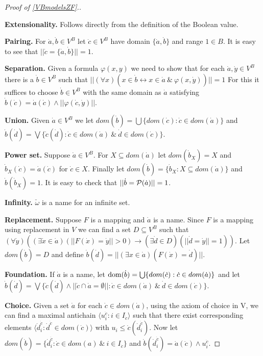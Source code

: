\begin{proof}[Proof of \ref{VBmodelsZF}.]\label{VBmodelsZFproof}

 {\bf Extensionality.} Follows directly from the definition of the Boolean value.

 {\bf Pairing.} For $\dot{a},\dot{b}\in V^B$ let $\dot{c}\in V^B$ have domain $\{\dot{a},\dot{b}\}$ and
 range $1\in B$. It is easy to see that $||\dot{c}=\{\dot{a},\dot{b}\}||=1$.

 {\bf Separation.} Given a formula $\varphi(x,y)$ we need to show that for each $\dot{a},\dot{y}\in V^B$ there is a $\dot{b}\in V^B$ such that
 $
 ||(\forall x)(x\in\dot{b}\leftrightarrow x\in\dot{a}\ \&\ \varphi(x,\dot{y}))||=1
 $
 For this it suffices to choose $\dot{b}\in V^B$ with the same domain as $\dot{a}$ satisfying $\dot{b}(\dot{c})= \dot{a}(\dot{c})\wedge||\varphi(\dot{c},\dot{y})||$.

 {\bf Union.} Given $\dot{a}\in V^B$ we let $dom(\dot{b})=\bigcup\{dom(\dot{c}):\dot{c}\in dom(\dot{a})\}$ and
 $\dot{b}(\dot{d})=\bigvee\{\dot{c}(\dot{d}):\dot{c}\in dom(\dot{a})\ \&\ \dot{d}\in dom(\dot{c})\}$.

 {\bf Power set.} Suppose $\dot{a}\in V^B$. For $X\subseteq dom(\dot{a})$ let $dom(\dot{b}_X)= X$ and $\dot{b}_X(\dot{c})=\dot{a}(\dot{c})$ for $\dot{c}\in X$. Finally
 let $dom(\dot{b})=\{\dot{b}_X:X\subseteq dom(\dot{a})\}$ and $\dot{b}(\dot{b}_X)=1$. It is easy to check that $||\dot{b}={{\mathcal P}}(\dot{a})||=1$.

 {\bf Infinity.} $\check{\omega}$ is a name for an infinite set.

 {\bf Replacement.} Suppose $F$ is a mapping and $\dot{a}$ is a name. Since $F$ is a mapping using replacement in $V$ we can find a set $D\subseteq V^B$
 such that $(\forall \dot{y})((\exists \dot{x}\in\dot{a})(||F(\dot{x})=\dot{y}||>0)\rightarrow (\exists \dot{d}\in D)(||\dot{d}=\dot{y}||=1))$. Let $dom(\dot{b})=D$
 and define $\dot{b}(\dot{d})=||(\exists x\in\dot{a})(F(\dot{x})=\dot{d})||$.

 {\bf Foundation.} If $\dot{a}$ is a name, let $\hbox{dom}(\dot{b})=\bigcup\{dom(\dot{c}):\dot{c}\in dom(\dot{a})\}$ and let
      $\dot{b}(\dot{d})=\bigvee\{\dot{c}(\dot{d})\wedge||\dot{c}\cap\dot{a}=\emptyset||:\dot{c}\in dom(\dot{a})\ \&\ \dot{d}\in dom(\dot{c})\}$.

 {\bf Choice.} Given a set $\dot{a}$ for each $\dot{c}\in dom(\dot{a})$, using the axiom of choice in V, we can find a maximal antichain
 $\langle u^{\dot{c}}_i:i\in I_{\dot{c}}\rangle$
 such that there exist corresponding elements $\langle \dot{d}^{\dot{c}}_i:\dot{d}^{\dot{c}}\in dom(\dot{c})\rangle$ with $u_i\leq \dot{c}(\dot{d}^{\dot{c}}_i)$. Now let
 $dom(\dot{b})=\{\dot{d}^{\dot{c}}_i:\dot{c}\in dom(a)\ \&\ i\in I_{\dot{c}}\}$ and $\dot{b}(\dot{d}^{\dot{c}}_i)=\dot{a}(\dot{c})\wedge u^{\dot{c}}_i$.
\end{proof}







